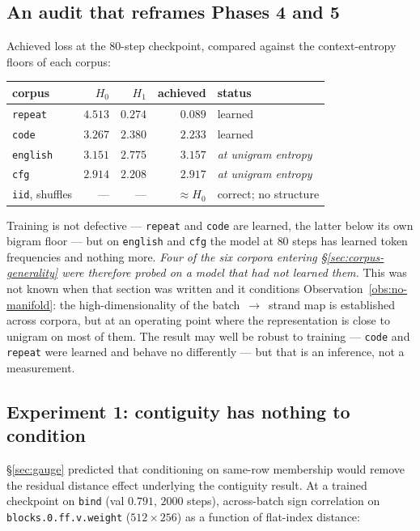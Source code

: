 \subsection{An audit that reframes Phases 4 and 5}
\label{sec:adequacy}

Achieved loss at the $80$-step checkpoint, compared against the context-entropy
floors of each corpus:

\begin{center}
\begin{tabular}{lrrrl}
\hline
corpus & $H_0$ & $H_1$ & achieved & status \\
\hline
\texttt{repeat}  & $4.513$ & $0.274$ & $0.089$ & learned \\
\texttt{code}    & $3.267$ & $2.380$ & $2.233$ & learned \\
\texttt{english} & $3.151$ & $2.775$ & $3.157$ & \emph{at unigram entropy} \\
\texttt{cfg}     & $2.914$ & $2.208$ & $2.917$ & \emph{at unigram entropy} \\
\texttt{iid}, shuffles & --- & --- & $\approx H_0$ & correct; no structure \\
\hline
\end{tabular}
\end{center}

Training is not defective --- \texttt{repeat} and \texttt{code} are learned,
the latter below its own bigram floor --- but on \texttt{english} and
\texttt{cfg} the model at $80$ steps has learned token frequencies and nothing
more. \emph{Four of the six corpora entering \S\ref{sec:corpus-generality} were
therefore probed on a model that had not learned them.} This was not known when
that section was written and it conditions
Observation~\ref{obs:no-manifold}: the high-dimensionality of the
batch~$\to$~strand map is established across corpora, but at an operating point
where the representation is close to unigram on most of them. The result may
well be robust to training --- \texttt{code} and \texttt{repeat} were learned
and behave no differently --- but that is an inference, not a measurement.

\subsection{Experiment 1: contiguity has nothing to condition}
\label{sec:contig}

\S\ref{sec:gauge} predicted that conditioning on same-row membership would
remove the residual distance effect underlying the contiguity result. At a
trained checkpoint on \texttt{bind} (val $0.791$, $2000$ steps), across-batch
sign correlation on \texttt{blocks.0.ff.v.weight} ($512\times256$) as a
function of flat-index distance:

